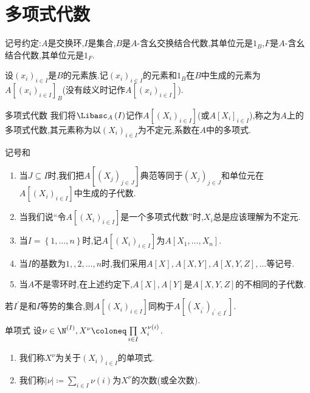 \section{多项式代数}

记号约定:$A$是交换环,$I$是集合,$B$是$A$-含幺交换结合代数,其单位元是$1_{B}$,$F$是$A$-含幺结合代数,其单位元是$1_{F}$.

\begin{definition}{}{}
	设$\left(x_{i}\right)_{i\in I}$是$B$的元素族.记$\left(x_{i}\right)_{i\in I}$的元素和$1_{B}$在$B$中生成的元素为$A\left[\left(x_{i}\right)_{i\in I}\right]_{B}$(没有歧义时记作$A\left[\left(x_{i}\right)_{i\in I}\right]$).
\end{definition}

\begin{definition}{多项式代数}{}
	我们将$\Libasc_{A}\left(I\right)$记作$A\left[\left(X_{i}\right)_{i\in I}\right]$(或$A\left[X_{i}\right]_{i\in I}$),称之为$A$上的多项式代数,其元素称为以$\left(X_{i}\right)_{i\in I}$为不定元,系数在$A$中的多项式.
\end{definition}

\begin{convention}{记号和}{}
	\begin{enumerate}
		\item 当$J\subseteq I$时,我们把$A\left[\left(X_{j}\right)_{j\in J}\right]$典范等同于$\left(X_{j}\right)_{j\in J}$和单位元在$A\left[\left(X_{i}\right)_{i\in I}\right]$中生成的子代数.
		\item 当我们说``令$A\left[\left(X_{i}\right)_{i\in I}\right]$是一个多项式代数''时,$X_{i}$总是应该理解为不定元.
		\item 当$I=\left\{1,\ldots,n\right\}$时,记$A\left[\left(X_{i}\right)_{i\in I}\right]$为$A\left[X_{1},\ldots,X_{n}\right]$.
		\item 当$I$的基数为$1,,2,\ldots,n$时,我们采用$A\left[X\right],A\left[X,Y\right],A\left[X,Y,Z\right],\ldots$等记号.
		\item 当$A$不是零环时,在上述约定下,$A\left[X\right],A\left[Y\right]$是$A\left[X,Y,Z\right]$的不相同的子代数.
	\end{enumerate}
\end{convention}

\begin{proposition}{}{}
	若$I^{\prime}$是和$I$等势的集合,则$A\left[\left(X_{i}\right)_{i\in I}\right]$同构于$A\left[\left(X_{i^{\prime}}\right)_{i^{\prime}\in I^{\prime}}\right]$.
\end{proposition}

\begin{definition}{单项式}{}
	设$\nu\in\N^{\left(I\right)},X^{\nu}\coloneq\prod\limits_{i\in I}X_{i}^{\nu\left(i\right)}$.
	\begin{enumerate}
		\item 我们称$X^{\nu}$为关于$\left(X_{i}\right)_{i\in I}$的单项式.
		\item 我们称$\left|\nu\right|\coloneq\sum\limits_{i\in I}\nu\left(i\right)$为$X^{\nu}$的次数(或全次数).
	\end{enumerate}
\end{definition}


